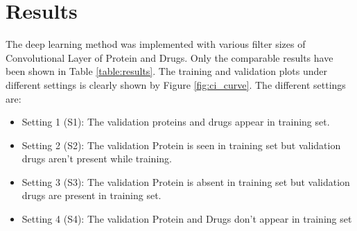 \section{Results}

The deep learning method was implemented with various filter sizes of Convolutional Layer of Protein and Drugs. Only the comparable results have been shown in Table \ref{table:results}. The training and validation plots under different settings is clearly shown by Figure \ref{fig:ci_curve}. The different settings are:
\begin{itemize}
    \item Setting 1 (S1): The validation proteins and drugs appear in training set.
    \item Setting 2 (S2): The validation Protein is seen in training set but validation drugs aren't present while training.
    \item Setting 3 (S3): The validation Protein is absent in training set but validation drugs are present in training set.
    \item Setting 4 (S4): The validation Protein and Drugs don't appear in training set
\end{itemize}

